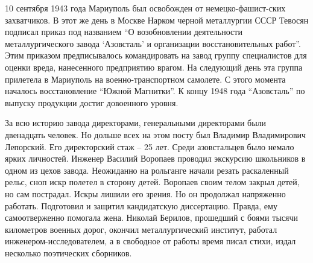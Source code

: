 10 сентября 1943 года Мариуполь был освобожден от немецко-фашист\hyp{}ских
захватчиков. В этот же день в Москве Нарком черной металлургии  СССР Тевосян
подписал приказ под названием \enquote{О возобновлении деятельности металлургического
завода \enquote{Азовсталь} и организации восстановительных работ}. Этим приказом
предписывалось командировать на завод группу специалистов  для оценки вреда,
нанесенного предприятию врагом. На следующий день эта группа прилетела в
Мариуполь на военно-транспортном самолете. С этого момента началось
восстановление \enquote{Южной Магнитки}. К концу 1948 года \enquote{Азовсталь} по выпуску
продукции достиг довоенного уровня.

За всю историю завода директорами, генеральными директорами были двенадцать
человек. Но дольше всех на этом посту был Владимир Владимирович Лепорский. Его
директорский стаж – 25 лет.  Среди азовстальцев было немало ярких личностей.
Инженер Василий Воропаев проводил экскурсию школьников  в одном из цехов
завода. Неожиданно на рольганге начали резать раскаленный рельс, сноп искр
полетел в сторону детей. Воропаев своим телом закрыл детей, но сам пострадал.
Искры лишили его зрения. Но он продолжал напряженно  работать. Подготовил и
защитил кандидатскую диссертацию. Правда, ему самоотверженно помогала жена.
Николай Берилов, прошедший с боями тысячи километров военных дорог, окончил
металлургический институт, работал инженером-исследователем, а в свободное от
работы время писал стихи, издал несколько поэтических сборников.
